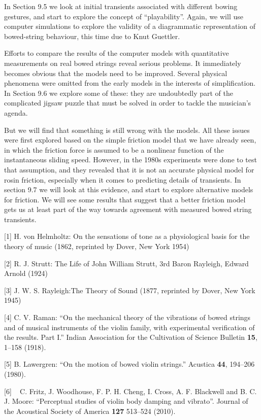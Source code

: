   In Section 9.5 we look at initial transients associated with different bowing 
  gestures, and start to explore the concept of “playability”. Again, we will 
  use computer simulations to explore the validity of a diagrammatic 
  representation of bowed-string behaviour, this time due to Knut Guettler. 

  Efforts to compare the results of the computer models with quantitative 
  measurements on real bowed strings reveal serious problems. It immediately 
  becomes obvious that the models need to be improved. Several physical 
  phenomena were omitted from the early models in the interests of 
  simplification. In Section 9.6 we explore some of these: they are undoubtedly 
  part of the complicated jigsaw puzzle that must be solved in order to tackle 
  the musician's agenda. 

  But we will find that something is still wrong with the models. All these 
  issues were first explored based on the simple friction model that we have 
  already seen, in which the friction force is assumed to be a nonlinear 
  function of the instantaneous sliding speed. However, in the 1980s 
  experiments were done to test that assumption, and they revealed that it is 
  not an accurate physical model for rosin friction, especially when it comes 
  to predicting details of transients. In section 9.7 we will look at this 
  evidence, and start to explore alternative models for friction. We will see 
  some results that suggest that a better friction model gets us at least part 
  of the way towards agreement with measured bowed string transients. 



  \sectionreferences{}[1] H. von Helmholtz: On the sensations of tone as a 
  physiological basis for the theory of music (1862, reprinted by Dover, New 
  York 1954) 

  [2] R. J. Strutt: The Life of John William Strutt, 3rd Baron Rayleigh, Edward 
  Arnold (1924) 

  [3] J. W. S. Rayleigh:The Theory of Sound (1877, reprinted by Dover, New York 
  1945) 

  [4] C. V. Raman: ``On the mechanical theory of the vibrations of bowed 
  strings and of musical instruments of the violin family, with experimental 
  verification of the results. Part I.'' Indian Association for the Cultivation 
  of Science Bulletin \textbf{15}, 1–158 (1918). 

  [5] B. Lawergren: ``On the motion of bowed violin strings.'' Acustica 
  \textbf{44}, 194–206 (1980). 

  [6] ~ C. Fritz, J. Woodhouse, F. P. H. Cheng, I. Cross, A. F. Blackwell and 
  B. C. J. Moore: ``Perceptual studies of violin body damping and vibrato''. 
  Journal of the Acoustical Society of America \textbf{127} 513--524 (2010). 